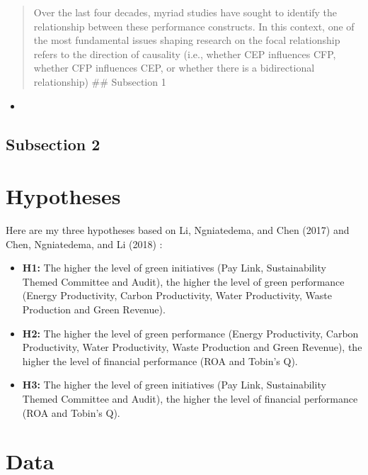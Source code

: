 \documentclass[12pt,]{article}
\begin{document}
\begin{quote}
Over the last four decades, myriad studies have sought to identify the
relationship between these performance constructs. In this context, one
of the most fundamental issues shaping research on the focal
relationship refers to the direction of causality (i.e., whether CEP
influences CFP, whether CFP influences CEP, or whether there is a
bidirectional relationship) \#\# Subsection 1
\end{quote}

\begin{itemize}
\item
\end{itemize}

\subsection{Subsection 2}\label{subsection-2}

\FloatBarrier
\newpage
{}

\section{Hypotheses}\label{hypotheses}

Here are my three hypotheses based on Li, Ngniatedema, and Chen (2017)
and Chen, Ngniatedema, and Li (2018) :

\begin{itemize}
\item
  \textbf{H1:} The higher the level of green initiatives (Pay Link,
  Sustainability Themed Committee and Audit), the higher the level of
  green performance (Energy Productivity, Carbon Productivity, Water
  Productivity, Waste Production and Green Revenue).
\item
  \textbf{H2:} The higher the level of green performance (Energy
  Productivity, Carbon Productivity, Water Productivity, Waste
  Production and Green Revenue), the higher the level of financial
  performance (ROA and Tobin's Q).
\item
  \textbf{H3:} The higher the level of green initiatives (Pay Link,
  Sustainability Themed Committee and Audit), the higher the level of
  financial performance (ROA and Tobin's Q).
\end{itemize}

\FloatBarrier
\newpage
{}

\section{Data}\label{data}
\end{document}
